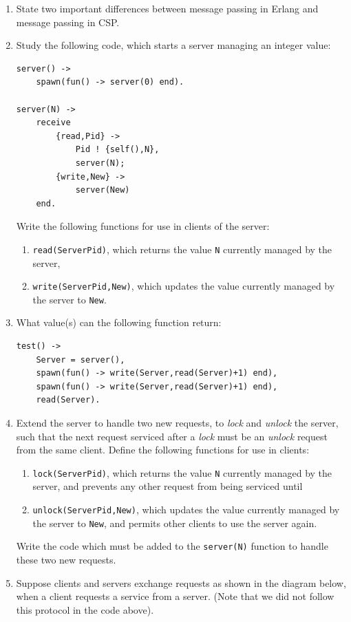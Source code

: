 \documentclass{article}
\begin{document}
\begin{enumerate}
\item
State two important differences between message passing in Erlang and
message passing in CSP.

\item
Study the following code, which starts a server managing an integer value:
\begin{verbatim}
server() ->
    spawn(fun() -> server(0) end).

server(N) ->
    receive
        {read,Pid} ->
            Pid ! {self(),N},
            server(N);
        {write,New} ->
            server(New)
    end.
\end{verbatim}
Write the following functions for use in clients of the server:
\begin{enumerate}
\item
\verb!read(ServerPid)!, which returns the value \verb!N! currently managed by the server,
\item
\verb!write(ServerPid,New)!, which updates the value currently managed by the server to \verb!New!.
\end{enumerate}

\item
What value(s) can the following function return:
\begin{verbatim}
test() ->
    Server = server(),
    spawn(fun() -> write(Server,read(Server)+1) end),
    spawn(fun() -> write(Server,read(Server)+1) end),
    read(Server).
\end{verbatim}

\item
Extend the server to handle two new requests, to {\em lock} and {\em
  unlock} the server, such that the next request serviced after a {\em
  lock} must be an {\em unlock} request from the same client. Define
the following functions for use in clients:
\begin{enumerate}
\item
\verb!lock(ServerPid)!, which returns the value \verb!N! currently
managed by the server, and prevents any other request from being
serviced until
\item
\verb!unlock(ServerPid,New)!, which updates the value currently
managed by the server to \verb!New!, and permits other clients to use
the server again.
\end{enumerate}
Write the code which must be added to the \verb!server(N)! function to
handle these two new requests.
\item
Suppose clients and servers exchange requests as shown in the diagram
below, when a client requests a service from a server. (Note that we
did not follow this protocol in the code above).


\end{enumerate}
\end{document}
